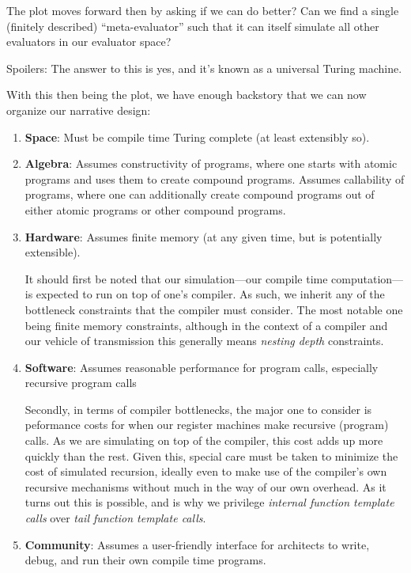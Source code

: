 \documentclass[twoside]{article}
\newcommand{\strong}[1]{{\bfseries #1}}
\begin{document}
The plot moves forward then by asking if we can do better? Can we find a single (finitely described)
``meta-evaluator'' such that it can itself simulate all other evaluators in our evaluator space?

Spoilers: The answer to this is yes, and it's known as a universal Turing machine.

With this then being the plot, we have enough backstory that we can now organize our narrative design:

\begin{enumerate}

\item \strong{Space}: Must be compile time Turing complete (at least extensibly so).

\item \strong{Algebra}: Assumes constructivity of programs, where one starts with atomic programs and uses them to create
compound programs. Assumes callability of programs, where one can additionally create compound programs out of either
atomic programs or other compound programs.

\item \strong{Hardware}: Assumes finite memory (at any given time, but is potentially extensible).

It should first be noted that our simulation---our compile time computation---is expected to run on top
of one's compiler. As such, we inherit any of the bottleneck constraints that the compiler must consider.
The most notable one being finite memory constraints, although in the context of a compiler and our vehicle
of transmission this generally means \emph{nesting depth} constraints.

\item \strong{Software}: Assumes reasonable performance for program calls, especially recursive program calls

Secondly, in terms of compiler bottlenecks, the major one to consider is peformance costs for when our register machines
make recursive (program) calls. As we are simulating on top of the compiler, this cost adds up more quickly than the
rest. Given this, special care must be taken to minimize the cost of simulated recursion, ideally even to make use
of the compiler's own recursive mechanisms without much in the way of our own overhead. As it turns out this is possible,
and is why we privilege \emph{internal function template calls} over \emph{tail function template calls}.

\item \strong{Community}: Assumes a user-friendly interface for architects to write, debug, and run their own
compile time programs.


\end{enumerate}
\end{document}
